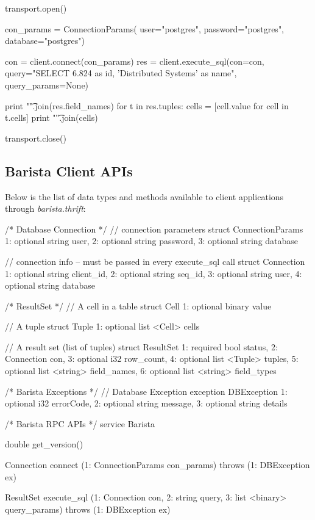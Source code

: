 \documentclass[a4paper]{article}
\begin{document}
\begin{multicols}{2}
{{\begin{spverbatim}
transport.open()

con_params = ConnectionParams(
  user="postgres", password="postgres", database="postgres")

con = client.connect(con_params)
res = client.execute_sql(con=con,
    query="SELECT 6.824 as id, 'Distributed Systems' as name",
    query_params=None)

print "\t".join(res.field_names)
for t in res.tuples:
  cells = [cell.value for cell in t.cells]
  print "\t".join(cells)

transport.close()
\end{spverbatim}
}
}
\subsection{Barista Client APIs}
Below is the list of data types and methods available to client applications through \emph{barista.thrift}:
\tiny{
\begin{spverbatim}
/* Database Connection */
// connection parameters
struct ConnectionParams {
  1: optional string user,
  2: optional string password,
  3: optional string database
}

// connection info -- must be passed in every execute_sql call
struct Connection {
  1: optional string client_id,
  2: optional string seq_id,
  3: optional string user,
  4: optional string database
}


/* ResultSet */
// A cell in a table
struct Cell {
  1: optional binary value
}

// A tuple
struct Tuple {
  1: optional list <Cell> cells
}

// A result set (list of tuples)
struct ResultSet {
  1: required bool status,
  2: Connection con,
  3: optional i32 row_count,
  4: optional list <Tuple> tuples,
  5: optional list <string> field_names,
  6: optional list <string> field_types
}


/* Barista Exceptions */
// Database Exception
exception DBException {
  1: optional i32 errorCode,
  2: optional string message,
  3: optional string details
}


/* Barista RPC APIs */
service Barista {
  double get_version()

  Connection connect (1: ConnectionParams con_params)
      throws (1: DBException ex)

  ResultSet execute_sql (1: Connection con, 2: string query,
      3: list <binary> query_params) throws (1: DBException ex)
}
\end{spverbatim}
}
\end{multicols}
\end{document}
